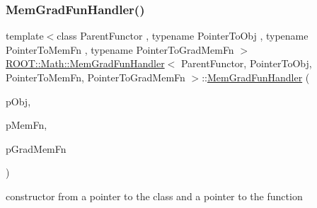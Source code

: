 \subsubsection{\texorpdfstring{MemGradFunHandler()}{MemGradFunHandler()}\hspace{0.1cm}{\footnotesize\ttfamily [3/4]}}
{\footnotesize\ttfamily template$<$class Parent\+Functor , typename Pointer\+To\+Obj , typename Pointer\+To\+Mem\+Fn , typename Pointer\+To\+Grad\+Mem\+Fn $>$ \\
\mbox{\hyperlink{classROOT_1_1Math_1_1MemGradFunHandler}{R\+O\+O\+T\+::\+Math\+::\+Mem\+Grad\+Fun\+Handler}}$<$ Parent\+Functor, Pointer\+To\+Obj, Pointer\+To\+Mem\+Fn, Pointer\+To\+Grad\+Mem\+Fn $>$\+::\mbox{\hyperlink{classROOT_1_1Math_1_1MemGradFunHandler}{Mem\+Grad\+Fun\+Handler}} (\begin{DoxyParamCaption}\item[{const Pointer\+To\+Obj \&}]{p\+Obj,  }\item[{Pointer\+To\+Mem\+Fn}]{p\+Mem\+Fn,  }\item[{Pointer\+To\+Grad\+Mem\+Fn}]{p\+Grad\+Mem\+Fn }\end{DoxyParamCaption})\hspace{0.3cm}{\ttfamily [inline]}}



constructor from a pointer to the class and a pointer to the function 

\mbox{\label{classROOT_1_1Math_1_1MemGradFunHandler_a1e421d0a42589a826fd0b9f7f1a475ec}} 
